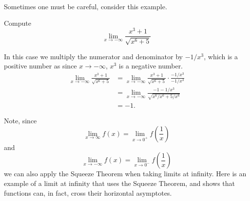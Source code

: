 \documentclass{ximera}
\begin{document}
Sometimes one must be careful, consider this example.

\begin{example}
Compute
\[
\lim_{x\to -\infty} \frac{x^3+1}{\sqrt{x^6+5}}
\]
\begin{explanation}
In this case we multiply the numerator and denominator by $-1/x^3$,
which is a positive number as since $x\to -\infty$, $x^3$ is a negative
number.
\begin{align*}
\lim_{x\to -\infty} \frac{x^3+1}{\sqrt{x^6+5}} &= \lim_{x\to -\infty} \frac{x^3+1}{\sqrt{x^6+5}} \cdot \frac{-1/x^3}{-1/x^3}\\
&= \lim_{x\to -\infty} \frac{-1-1/x^3}{\sqrt{x^6/x^6+5/x^6}}\\
&= -1.
\end{align*}
\end{explanation}
\end{example}

Note, since
\[
\lim_{x\to \infty} f(x) = \lim_{x\to 0^+} f\left(\frac{1}{x}\right)
\]
and
\[
\lim_{x\to -\infty} f(x) = \lim_{x\to 0^-} f\left(\frac{1}{x}\right)
\]
we can also apply the Squeeze Theorem when taking limits at infinity.
Here is an example of a limit at infinity that uses the Squeeze
Theorem, and shows that functions can, in fact, cross their horizontal
asymptotes.
\end{document}
